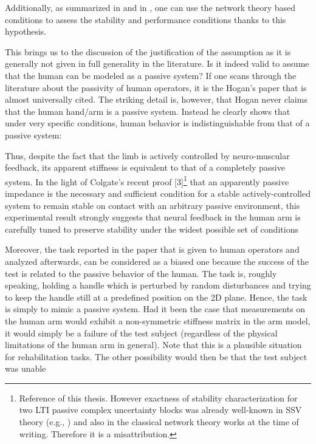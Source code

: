 Additionally, as summarized in  and in , one can use the 
network theory based conditions to assess the stability and performance conditions thanks to this hypothesis.

This brings us to the discussion of the justification of the assumption as it is generally not given in full generality in the
literature. Is it indeed valid to assume that the human can be modeled as a passive system? If one scans through the literature 
about the passivity of human operators, it is the Hogan's paper \cite{hogan89}
that is almost universally cited. The striking detail is, however, that Hogan never claims that the human hand/arm is a passive
system. Instead he clearly shows that under very specific conditions, human behavior is indistinguishable from that of a 
passive system: 
\begin{displayquote}
Thus, despite the fact that the
limb is actively controlled by neuro-muscular feedback, its apparent stiffness is equivalent to that of a completely passive
system. In the light of Colgate's recent proof [3]\footnote{Reference \cite{colgatehogan88} of this thesis. However exactness 
of stability characterization for two LTI passive complex uncertainty blocks was already well-known in SSV theory (e.g., \cite{packdoyle}) 
and also in the classical network theory works at the time of writing. Therefore it is a misattribution.} that an apparently 
passive impedance is the necessary and sufficient condition for a stable actively-controlled system to remain stable on contact 
with an arbitrary passive environment, this experimental result strongly suggests that neural feedback in the human arm is carefully 
tuned to preserve stability under the widest possible set of conditions
\end{displayquote}
Moreover, the task reported in the paper that is given to human operators and analyzed afterwards, can be considered as a biased one because the success 
of the test is related to the passive behavior of the human. The task is, roughly speaking, holding a handle which is perturbed by 
random disturbances and trying to keep the handle still at a predefined position on the 2D plane. Hence, the task is simply to mimic 
a passive system. Had it been the case that measurements on the human arm would exhibit a non-symmetric stiffness matrix in the arm 
model, it would simply be a failure of the test subject (regardless of the physical limitations of the human arm in general). Note 
that this is a plausible situation for rehabilitation tasks. The other possibility would then be that the test subject was unable 
